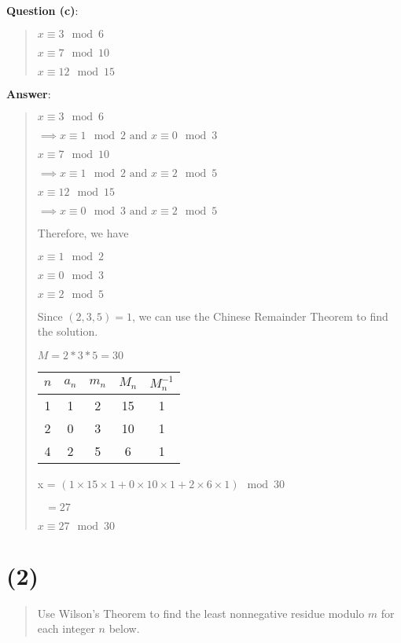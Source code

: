 \documentclass{article} %
\begin{document}
\bigskip

\bigskip
\noindent
\textbf{Question (c)}:
\begin{quote}
    $x \equiv 3 \mod 6$

    $x \equiv 7 \mod 10$

    $x \equiv 12 \mod 15$
\end{quote}

\pagebreak
\noindent
\textbf{Answer}:
\begin{quote}
    $x \equiv 3 \mod 6$

    $\implies x \equiv 1 \mod 2 \text{ and } x \equiv 0 \mod 3$

    $x \equiv 7 \mod 10$

    $\implies x \equiv 1 \mod 2 \text{ and } x \equiv 2 \mod 5$

    $x \equiv 12 \mod 15$

    $\implies x \equiv 0 \mod 3 \text{ and } x \equiv 2 \mod 5$
    \bigskip

    Therefore, we have

    $x \equiv 1 \mod 2$

    $x \equiv 0 \mod 3$

    $x \equiv 2 \mod 5$
    \bigskip

    Since $(2, 3, 5) = 1$, we can use the Chinese Remainder Theorem to find the solution.

    $M = 2 * 3 * 5 = 30$

    \begin{tabular}{|c|c|c|c|c|}
        \hline
        $n$ & $a_n$ & $m_n$ & $M_n$ & $M_n^{-1}$ \\
        \hline
        1   & 1     & 2     & 15    & 1          \\
        \hline
        2   & 0     & 3     & 10    & 1          \\
        \hline
        4   & 2     & 5     & 6     & 1          \\
        \hline
    \end{tabular}

    x = $(1 \times 15 \times 1 + 0 \times 10 \times 1 + 2 \times 6 \times 1) \mod 30$

    $\text{  } = 27$

    $\boxed{x \equiv 27 \mod 30}$
\end{quote}

\bigskip

\section*{(2)}
\begin{quote}
    Use Wilson's Theorem to find the least nonnegative residue modulo $m$ for each integer $n$ below.
\end{quote}
\end{document}
